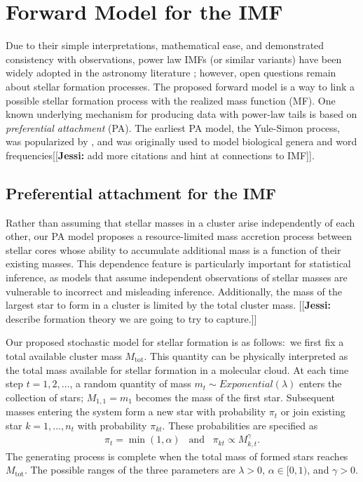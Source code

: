 \documentclass[12pt]{article}
\newcommand{\jessi}[1]{{\color{blue}[[\textbf{Jessi: }#1]]}}
\newcommand{\Mtot}{M_{\text{tot}}}
\begin{document}
\section{Forward Model for the IMF}
\label{PAmodelSection}
Due to their simple interpretations, mathematical ease, and demonstrated consistency with observations, power law IMFs (or similar variants) have been widely adopted in the astronomy literature \citep{kroupa2012}; however, open questions remain about stellar formation processes.  The proposed forward model is a way to link a possible stellar formation process with the realized mass function (MF).  One known underlying mechanism for producing data with power-law tails is based on {\em preferential attachment} (PA).  
The earliest PA model, the Yule-Simon process, was popularized by \cite{simon55}, and was originally used to model biological genera and word frequencies\jessi{add more citations and hint at connections to IMF}. 


\subsection{Preferential attachment for the IMF} \label{sec:pa}
Rather than assuming that stellar masses in a cluster arise independently of each other, our PA model proposes a resource-limited mass accretion process between stellar cores whose ability to accumulate additional mass is a function of their existing masses. 
This dependence feature is particularly important for statistical inference, as models that assume independent observations of stellar masses are vulnerable to incorrect and misleading inference. 
Additionally, the mass of the largest star to form in a cluster is limited by the total cluster mass.
\jessi{ describe formation theory we are going to try to capture.}  


Our proposed stochastic model for stellar formation is as follows:~we first fix a total available cluster mass $\Mtot$. 
This quantity can be physically interpreted as the total mass available for stellar formation in a molecular cloud. 
At each time step $t = 1, 2, \ldots$, a random quantity of mass $m_t \sim Exponential(\lambda)$ enters the collection of stars; $M_{1,1} = m_1$ becomes the mass of the first star.
Subsequent masses entering the system form a new star with probability $\pi_t$ or join existing star $k = 1, \ldots, n_t$ with probability $\pi_{kt}$.
These probabilities are specified as
\begin{align}
	\pi_t = \min \left (1, \alpha \right ) \;\;\; \text{and} \;\;\; \pi_{kt} \propto M_{k,t}^{\gamma}\text{.}
\label{eq:PAstars}
\end{align}
The generating process is complete when the total mass of formed stars reaches $\Mtot$. 
The possible ranges of the three parameters are $\lambda > 0$, $\alpha \in [0,1)$, and $\gamma > 0$. 
\end{document}
